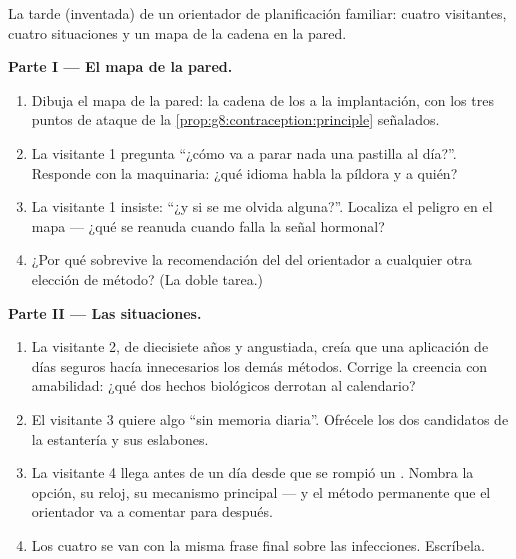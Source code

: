 \begin{problem}\label{pb:g8:contraception:1}
La tarde (inventada) de un orientador de planificación familiar: cuatro
visitantes, cuatro situaciones y un mapa de la cadena en la pared.

\medskip\noindent\textbf{Parte I --- El mapa de la pared.}
\begin{enumerate}
  \item Dibuja el mapa de la pared: la cadena de los  a la
        implantación, con los tres puntos de ataque de la
        \cref{prop:g8:contraception:principle} señalados.
  \item La visitante 1 pregunta ``¿cómo va a parar nada una pastilla al
        día?''. Responde con la maquinaria: ¿qué idioma habla la
        píldora y a quién?
  \item La visitante 1 insiste: ``¿y si se me olvida alguna?''. Localiza
        el peligro en el mapa --- ¿qué se reanuda cuando falla la señal
        hormonal?
  \item ¿Por qué sobrevive la recomendación del  del
        orientador a cualquier otra elección de método? (La doble
        tarea.)
\end{enumerate}

\medskip\noindent\textbf{Parte II --- Las situaciones.}
\begin{enumerate}[resume]
  \item La visitante 2, de diecisiete años y angustiada, creía que una
        aplicación de días seguros hacía innecesarios los demás
        métodos. Corrige la creencia con amabilidad: ¿qué dos hechos
        biológicos derrotan al calendario?
  \item El visitante 3 quiere algo ``sin memoria diaria''. Ofrécele los
        dos candidatos de la estantería y sus eslabones.
  \item La visitante 4 llega antes de un día desde que se rompió un
        . Nombra la opción, su reloj, su mecanismo
        principal --- y el método permanente que el orientador va a
        comentar para después.
  \item Los cuatro se van con la misma frase final sobre las
        infecciones. Escríbela.
\end{enumerate}


\end{problem}
